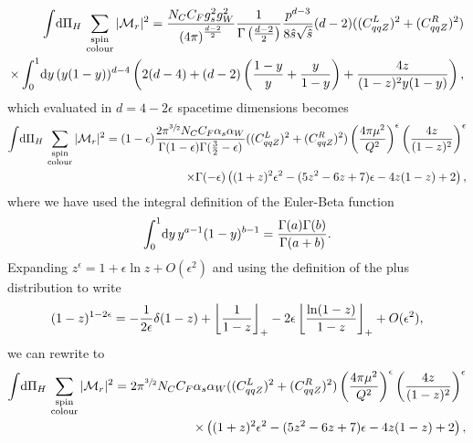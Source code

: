 \documentclass[../main.tex]{subfiles}
\begin{document}
\begin{align}
  \nonumber
  \integral{\Pi_H} \sum_{\substack{\text{spin} \\\text{colour}}} |\M_r|^2 = \frac{N_C C_F g_s^2 g_W^2}{\pclosed{4\pi}^{\frac{d-2}{2}}} \frac{1}{\Gamma\pclosed{\frac{d-2}{2}}} \frac{p^{d-3}}{8\hat{s}\sqrt{\hat{s}}} (d-2) ((C_{qqZ}^L)^2 + (C_{qqZ}^R)^2) \\
  \times \integral[_0^1]{y} (y(1-y))^{d-4} \pclosed{2(d-4) + (d-2)\pclosed{\frac{1-y}{y} + \frac{y}{1-y}} + \frac{4z}{(1-z)^2 y(1-y)}},
\end{align}
which evaluated in \(d=4-2\epsilon\) spacetime dimensions becomes
\begin{align}
  \nonumber
  \integral{\Pi_H} \sum_{\substack{\text{spin} \\\text{colour}}} |\M_r|^2 = (1-\epsilon) \frac{2 \pi^{\sfrac{3}{2}} N_C C_F \alpha_s \alpha_W}{\Gamma(1-\epsilon) \Gamma(\frac{3}{2}-\epsilon)} ((C_{qqZ}^L)^2 + (C_{qqZ}^R)^2) \pclosed{\frac{4\pi \mu^2}{Q^2}}^{\epsilon} \pclosed{\frac{4z}{(1-z)^2}}^\epsilon \\
  \times \Gamma(-\epsilon) \pclosed{(1+z)^2 \epsilon^2 - (5z^2-6z+7)\epsilon - 4z(1-z) + 2},
\end{align}
where we have used the integral definition of the Euler-Beta function
\begin{equation}
  \integral[_0^1]{y} y^{a-1}(1-y)^{b-1} = \frac{\Gamma(a)\Gamma(b)}{\Gamma(a+b)}.
\end{equation}
Expanding \(z^{\epsilon} = 1 + \epsilon \ln z + O(\epsilon^2)\) and using the definition of the plus distribution to write
\begin{equation}
  (1-z)^{1-2\epsilon} = -\frac{1}{2\epsilon} \delta(1-z) + \plusdist{\frac{1}{1-z}} -2\epsilon \plusdist{\frac{\ln(1-z)}{1-z}} + O(\epsilon^2),
\end{equation}
we can rewrite to
\begin{align}
  \nonumber
  \integral{\Pi_H} \sum_{\substack{\text{spin} \\\text{colour}}} |\M_r|^2 = 2 \pi^{\sfrac{3}{2}} N_C C_F \alpha_s \alpha_W ((C_{qqZ}^L)^2 + (C_{qqZ}^R)^2) \pclosed{\frac{4\pi \mu^2}{Q^2}}^{\epsilon} \pclosed{\frac{4z}{(1-z)^2}}^\epsilon \\
  \times \pclosed{(1+z)^2 \epsilon^2 - (5z^2-6z+7)\epsilon - 4z(1-z) + 2},
\end{align}
\end{document}
